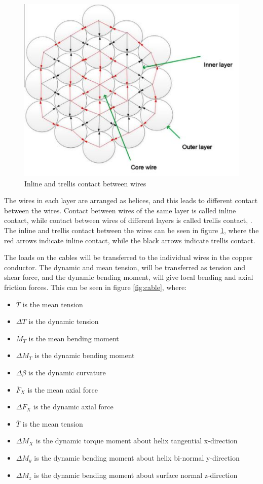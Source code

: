   \begin{figure}[H]
\centering
\includegraphics[scale=0.9]{figures/cross}
\caption[$\; \:$Inline and trellis contact between wires]{Inline and trellis contact between wires \cite{Nasution2013} }
 \label{fig:cross}
\end{figure}
  
 \noindent The wires in each layer are arranged as helices, and this leads to different contact between the wires. Contact between wires of the same layer is called inline contact, while contact between wires of different layers is called trellis contact, \cite{Nasution2013}. The inline and trellis contact between the wires can be seen in figure \ref{fig:cross}, where the red arrows indicate inline contact, while the black arrows indicate trellis contact. 

\noindent The loads on the cables will be transferred to the individual wires in the copper conductor. The dynamic and mean tension, will be transferred as tension and shear force, and the dynamic bending moment, will give local bending and axial friction forces. This can be seen in figure \ref{fig:cable}, where:
\begin{itemize}
    \item $\overline T$ is the mean tension
    \item $\Delta T$ is the dynamic tension
    \item $\overline M_T$ is the mean bending moment
    \item $\Delta M_T$ is the dynamic bending moment
    \item $\Delta \beta$ is the dynamic curvature
    \item $\overline F_X$ is the mean axial force
    \item $\Delta F_X$ is the dynamic axial force
    \item $\overline T$ is the mean tension
    \item $\Delta M_X$ is the dynamic torque moment about helix tangential x-direction
    \item $\Delta M_y$ is the dynamic bending moment about helix bi-normal y-direction
    \item $\Delta M_z$ is the dynamic bending moment about surface normal z-direction
\end{itemize}



